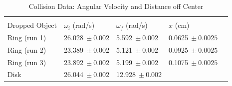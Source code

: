 \begin{table}[!htb]
	\centering
	\begin{tabular}{@{}lllll@{}}
		&  &  &  &  \\ \cmidrule(r){1-4}
		Dropped Object & $\omega_i$ (rad/s) & $\omega_f$ (rad/s) & $x$ (cm) &  \\ \cmidrule(r){1-4}
		\multicolumn{1}{l|}{Ring (run 1)} & \multicolumn{1}{l|}{26.028$\ \pm 0.002$} & \multicolumn{1}{l|}{5.592$\ \pm 0.002$} & 0.0625$\ \pm 0.0025$ &  \\
		\multicolumn{1}{l|}{Ring (run 2)} & \multicolumn{1}{l|}{23.389$\ \pm 0.002$} & \multicolumn{1}{l|}{5.121$\ \pm 0.002$} & 0.0925$\ \pm 0.0025$&  \\
		\multicolumn{1}{l|}{Ring (run 3)} & \multicolumn{1}{l|}{23.892$\ \pm 0.002$} & \multicolumn{1}{l|}{5.199$\ \pm 0.002$} & 0.1075$\ \pm 0.0025$ &  \\
		\multicolumn{1}{l|}{Disk} & \multicolumn{1}{l|}{26.044$\ \pm 0.002$} & \multicolumn{1}{l|}{12.928$\ \pm 0.002$} &  &  \\ \cmidrule(r){1-4}
	\end{tabular}
\caption{Collision Data: Angular Velocity and Distance off Center}
\end{table}

